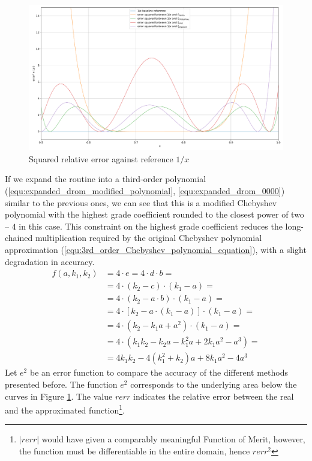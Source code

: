 \begin{figure}
    \includegraphics[width=1\textwidth]{figures/reciprocate_real_vs_taylor_vs_drom_error_squared.pdf} 
    \caption{Squared relative error against reference $1/x$}
    \label{fig:020301280980435232835} 
\end{figure} 
If we expand the routine into a  third-order polynomial (\ref{equ:expanded_drom_modified_polynomial}, \ref{equ:expanded_drom_0000}) similar to the previous ones, we can see that this is a modified Chebyshev polynomial with the highest grade coefficient rounded to the closest power of two -- $4$ in this case.
This constraint on the highest grade coefficient reduces the long-chained multiplication required by the original Chebyshev polynomial approximation (\ref{equ:3rd_order_Chebyshev_polynomial_equation}), with a slight degradation in accuracy.
\begin{equation}\label{equ:expanded_drom_modified_polynomial}
\begin{aligned}
f(a, k_1, k_2) &= 4 \cdot e = 4 \cdot d \cdot b = \\
&= 4 \cdot (k_2 - c) \cdot (k_1 - a) = \\
&= 4 \cdot (k_2 - a \cdot b) \cdot (k_1 - a) = \\
&= 4 \cdot [k_2 - a \cdot (k_1 - a)] \cdot (k_1 - a) = \\
&= 4 \cdot (k_2 - k_1 a + a^2) \cdot (k_1 - a) = \\
&= 4 \cdot (k_1 k_2 - k_2 a - k_1^2 a + 2 k_1 a^2 - a^3) = \\
&= 4 k_1 k_2 - 4(k_1^2 + k_2) a + 8 k_1 a^2 - 4 a^3
\end{aligned}
\end{equation}
Let $e^2$ be an error function to compare the accuracy of the different methods presented before. The function $e^2$ corresponds to the underlying area below the curves in Figure \ref{fig:020301280980435232835}. The value $rerr$ indicates the relative error between the real and the approximated function\footnote{$|rerr|$ would have given a comparably meaningful Function of Merit, however, the function must be differentiable in the entire domain, hence $rerr^2$}.
